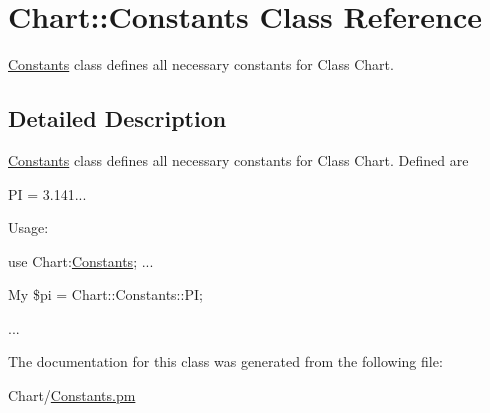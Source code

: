 \hypertarget{classChart_1_1Constants}{
\section{Chart::Constants Class Reference}
\label{classChart_1_1Constants}
}


\hyperlink{classChart_1_1Constants}{Constants} class defines all necessary constants for Class Chart.  




\subsection{Detailed Description}
\hyperlink{classChart_1_1Constants}{Constants} class defines all necessary constants for Class Chart. Defined are \par
 PI = 3.141...\par
 \par
 Usage:\par
 use Chart:\hyperlink{classChart_1_1Constants}{Constants}; ...\par
 My \$pi = Chart::Constants::PI;\par
 ...\par
 

The documentation for this class was generated from the following file:\begin{DoxyCompactItemize}
\item 
Chart/\hyperlink{Constants_8pm}{Constants.pm}\end{DoxyCompactItemize}
